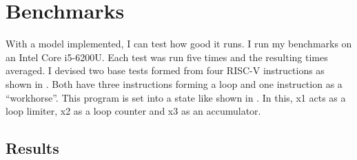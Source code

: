 \chapter{Benchmarks}\label{chap:benchmarks}
With a model implemented, I can test how good it runs. I run my
benchmarks on an Intel Core i5-6200U. Each test was run five times
and the resulting times averaged. I devised two base tests formed
from four RISC-V instructions as shown in
. Both have three instructions forming a
loop and one instruction as a \enquote{workhorse}. This program is
set into a state like shown in . In this,
x1 acts as a loop limiter, x2 as a loop counter and x3 as an
accumulator.



\section{Results}
